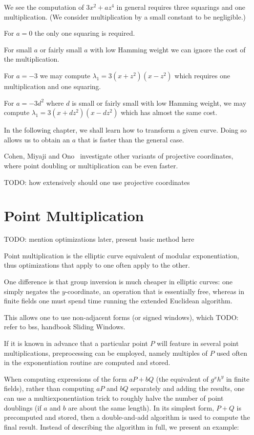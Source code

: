 We see the computation of $3x^2 + a z^4$ in general requires three
squarings and one multiplication. (We consider multiplication by
a small constant to be negligible.)

For $a=0$ the only one squaring is required.

For small $a$ or fairly small $a$ with low Hamming weight we can ignore
the cost of the multiplication.

For $a=-3$ we may compute $\lambda_1 = 3(x+z^2)(x-z^2)$ which requires
one multiplication and one squaring.

For $a = -3 d^2$ where $d$ is small or fairly small with low Hamming weight,
we may compute $\lambda_1 = 3(x+dz^2)(x-dz^2)$ which has almost the same cost.

In the following chapter, we shall learn how to
transform a given curve. Doing so allows us
to obtain an $a$ that is faster than the general case.

Cohen, Miyaji and Ono~\cite{cmo} investigate other variants of projective
coordinates, where point doubling or multiplication can be even faster.

TODO: how extensively should one use projective coordinates

\section {Point Multiplication}

TODO: mention optimizations later, present basic method here

Point multiplication is the elliptic curve equivalent of modular
exponentiation, thus optimizations that apply to one often apply to the other.

One difference is that group inversion is much cheaper in elliptic curves:
one simply negates the $y$-coordinate, an operation that is essentially free,
whereas in finite fields one must spend time running the extended
Euclidean algorithm.

This allows one to use non-adjacent forms (or signed windows), which
TODO: refer to bss, handbook
Sliding Windows.

If it is known in advance that a particular point $P$ will feature in
several point multiplications, preprocessing can be employed, namely
multiples of $P$ used often in the exponentiation routine
are computed and stored.

When computing expressions
of the form $a P + b Q$ (the equivalent of $g^x h^y$ in
finite fields), rather than computing $a P$ and $b Q$ separately
and adding the results, one can use
a multiexponentiation trick to roughly halve the number of point doublings
(if $a$ and $b$ are about the same length).
In its simplest form, $P + Q$ is precomputed and stored,
then a double-and-add algorithm is used to compute the
final result. Instead of describing the algorithm in full, we present
an example:

